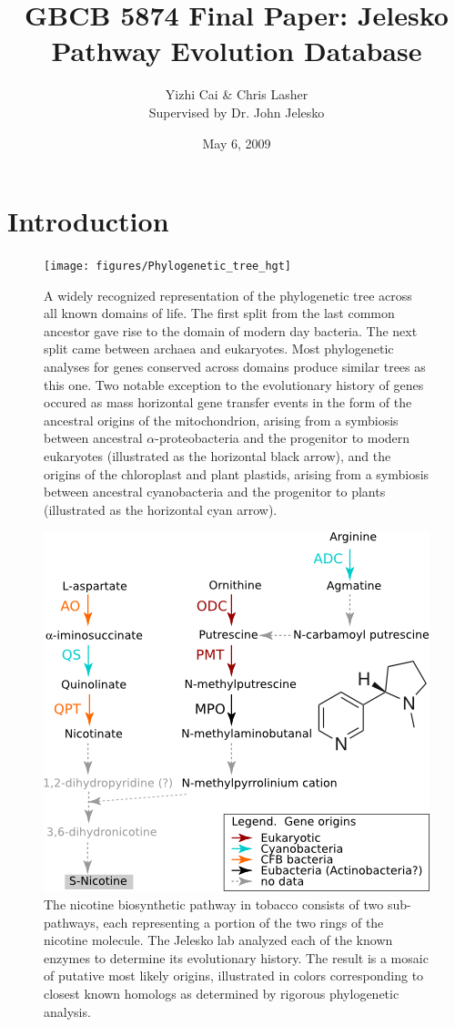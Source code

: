 \documentclass[11pt,letterpaper,twoside,english]{article}
\author{Yizhi Cai \& Chris Lasher\\
Supervised by Dr. John Jelesko}
\title{GBCB 5874 Final Paper: Jelesko Pathway Evolution Database}
\date{May 6, 2009}
\begin{document}
\maketitle

\section{Introduction}

\begin{figure}[htbp]
    \begin{center}
        \texttt{[image: figures/Phylogenetic\_tree\_hgt]}
    \end{center}
    \caption{A widely recognized representation of the phylogenetic tree
    across all known domains of life. The first split from the last common
    ancestor gave rise to the domain of modern day bacteria. The next split
    came between archaea and eukaryotes. Most phylogenetic analyses for genes
    conserved across domains produce similar trees as this one. Two notable
    exception to the evolutionary history of genes occured as mass horizontal
    gene transfer events in the form of the ancestral origins of the
    mitochondrion, arising from a symbiosis between ancestral
    $\alpha$-proteobacteria and the progenitor to modern eukaryotes
    (illustrated as the horizontal black arrow), and the origins of the
    chloroplast and plant plastids, arising from a symbiosis between ancestral
    cyanobacteria and the progenitor to plants (illustrated as the horizontal
    cyan arrow).}
\end{figure}

\begin{figure}[htbp]
    \begin{center}
        \includegraphics[width=.6\linewidth]{figures/pyridine_alkaloid_biosynthesis}
    \end{center}
    \caption{The nicotine biosynthetic pathway in tobacco consists of two
    sub-pathways, each representing a portion of the two rings of the nicotine
    molecule. The Jelesko lab analyzed each of the known enzymes to determine
    its evolutionary history. The result is a mosaic of putative most likely
    origins, illustrated in colors corresponding to closest known homologs as
    determined by rigorous phylogenetic analysis.}
\end{figure}
\end{document}
